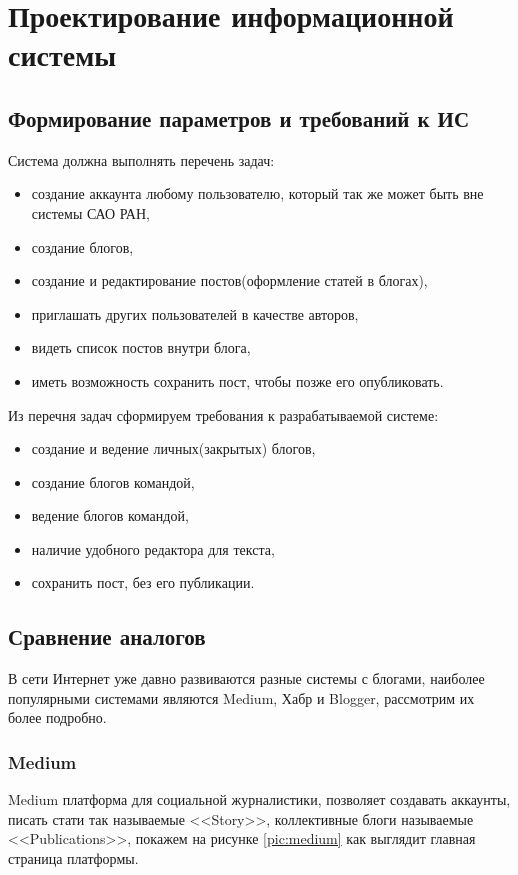 \section{Проектирование информационной системы}

\subsection{Формирование параметров и требований к ИС}
Система должна выполнять перечень задач:
\begin{itemize}
	\item создание аккаунта любому пользователю, который так же может быть вне системы САО РАН, 
	\item создание блогов,
	\item создание и редактирование постов(оформление статей в блогах),
	\item приглашать других пользователей в качестве авторов,
	\item видеть список постов внутри блога,
	\item иметь возможность сохранить пост, чтобы позже его опубликовать. 
\end{itemize}

Из перечня задач сформируем требования к разрабатываемой системе:
\begin{itemize}
	\item создание и ведение личных(закрытых) блогов,
	\item создание блогов командой,
	\item ведение блогов командой,
	\item наличие удобного редактора для текста,
	\item сохранить пост, без его публикации. 
\end{itemize}

\subsection{Сравнение аналогов}
В сети Интернет уже давно развиваются разные системы с блогами, наиболее популярными системами являются Medium, Хабр и Blogger, рассмотрим их более подробно.

\pagebreak
\subsubsection{Medium}
Medium платформа для социальной журналистики, позволяет создавать аккаунты, писать стати так называемые <<Story>>, коллективные блоги называемые <<Publications>>, покажем на рисунке \ref{pic:medium} как выглядит главная страница платформы.


